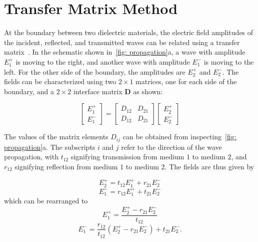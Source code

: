 \section{Transfer Matrix Method}\label{sec: TMM}
At the boundary between two dielectric materials, the electric field amplitudes of the incident, reflected, and transmitted waves can be related using a transfer matrix~\cite{jenaTransferMatrixBased2021, legallyblindbirdingAntiReflectionCoatingsPart2024}. In the schematic shown in~\ref{fig: propagation}a, a wave with amplitude $E_1^+$ is moving to the right, and another wave with amplitude $E_1^-$ is moving to the left. For the other side of the boundary, the amplitudes are $E_2^+$ and $E_2^-$. The fields can be characterized using two $2 \times 1$ matrices, one for each side of the boundary, and a $2 \times 2$ interface matrix $\mathbf{D}$ as shown:

\begin{equation} \label{eqn: initial_matrix}
	\begin{bmatrix} E_1^+ \\ E_1^- \end{bmatrix} = \begin{bmatrix} D_{12} & D_{21} \\ D_{12} & D_{21} \end{bmatrix} \begin{bmatrix} E_2^+ \\ E_2^- \end{bmatrix}
\end{equation}

The values of the matrix elements $D_{ij}$ can be obtained from inspecting~\ref{fig: propagation}a. The subscripts $i$ and $j$ refer to the direction of the wave propagation, with $t_{12}$ signifying transmission from medium $1$ to medium $2$, and $r_{12}$ signifying reflection from medium $1$ to medium $2$. The fields are thus given by

\begin{equation} \label{eqn: initial_matrix_element_1}
	E_2^+ = t_{12} E_1^+ + r_{21} E_2^-
\end{equation}
\begin{equation} \label{eqn: initial_matrix_element_2}
	E_1^- = r_{12} E_1^+ + t_{21} E_2^-
\end{equation}
which can be rearranged to
\begin{equation} \label{eqn: rearranged_matrix_elements_1}
	E_1^+ = \frac{E_2^+ - {r_{21}} E_2^-}{t_{12}}
\end{equation}
\begin{equation} \label{eqn: rearranged_matrix_elements_2}
	E_1^- = \frac{r_{12}}{t_{12}} \left( {E_2^+ - r_{21} E_2^-} \right) + t_{21}  E_2^-.
\end{equation}

